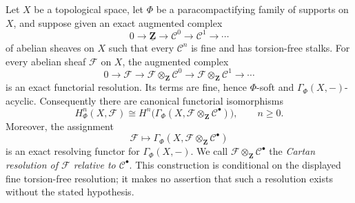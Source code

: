 \begin{lemma}
\label{lemma-cartan-resolution-fine-torsion-free}
\begin{reference}
\cite[Chapter III, \S 3.3, p. 160]{Tohoku}
\end{reference}
Let $X$ be a topological space, let $\Phi$ be a paracompactifying family
of supports on $X$, and suppose given an exact augmented complex
$$
0\longrightarrow\underline{\mathbf Z}\longrightarrow
\mathcal C^0\longrightarrow\mathcal C^1\longrightarrow\cdots
$$
of abelian sheaves on $X$ such that every $\mathcal C^n$ is fine and has
torsion-free stalks. For every abelian sheaf $\mathcal F$ on $X$, the
augmented complex
$$
0\longrightarrow\mathcal F\longrightarrow
\mathcal F\otimes_{\mathbf Z}\mathcal C^0\longrightarrow
\mathcal F\otimes_{\mathbf Z}\mathcal C^1\longrightarrow\cdots
$$
is an exact functorial resolution. Its terms are fine, hence
$\Phi$-soft and $\Gamma_\Phi(X,-)$-acyclic. Consequently there are
canonical functorial isomorphisms
$$
H^n_\Phi(X,\mathcal F)
\cong
H^n\bigl(\Gamma_\Phi
(X,\mathcal F\otimes_{\mathbf Z}\mathcal C^\bullet)\bigr),
\qquad n\geq0.
$$
Moreover, the assignment
$$
\mathcal F\longmapsto
\Gamma_\Phi(X,\mathcal F\otimes_{\mathbf Z}\mathcal C^\bullet)
$$
is an exact resolving functor for $\Gamma_\Phi(X,-)$. We call
$\mathcal F\otimes_{\mathbf Z}\mathcal C^\bullet$ the \emph{Cartan
resolution of $\mathcal F$ relative to $\mathcal C^\bullet$}. This
construction is conditional on the displayed fine torsion-free resolution;
it makes no assertion that such a resolution exists without the stated
hypothesis.
\end{lemma}

